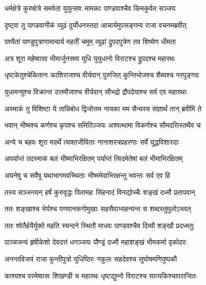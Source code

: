\twolineshloka
{धर्मक्षेत्रे कुरुक्षेत्रे समवेता युयुत्सवः}
{मामकाः पाण्डवाश्चैव किमकुर्वत सञ्जय}%

\twolineshloka
{दृष्ट्वा तु पाण्डवानीकं व्यूढं दुर्योधनस्तदा}
{आचार्यमुपसङ्गम्य राजा वचनमब्रवीत्}%

\twolineshloka
{पश्यैतां पाण्डुपुत्राणामाचार्य महतीं चमूम्}
{व्यूढां द्रुपदपुत्रेण तव शिष्येण धीमता}%

\twolineshloka
{अत्र शूरा महेष्वासा भीमार्जुनसमा युधि}
{युयुधानो विराटश्च द्रुपदश्च महारथः}%

\twolineshloka
{धृष्टकेतुश्चेकितानः काशिराजश्च वीर्यवान्}
{पुरुजित् कुन्तिभोजश्च शैब्यश्च नरपुङ्गवः}%

\twolineshloka
{युधामन्युश्च विक्रान्त उत्तमौजाश्च वीर्यवान्}
{सौभद्रो द्रौपदेयाश्च सर्व एव महारथाः}%

\twolineshloka
{अस्माकं तु विशिष्टा ये तान्निबोध द्विजोत्तम}
{नायका मम सैन्यस्य संज्ञार्थं तान् ब्रवीमि ते}%

\twolineshloka
{भवान् भीष्मश्च कर्णश्च कृपश्च समितिञ्जयः}
{अश्वत्थामा विकर्णश्च सौमदत्तिस्तथैव च}%

\twolineshloka
{अन्ये च बहवः शूरा मदर्थे त्यक्तजीविताः}
{नानाशस्त्रप्रहरणाः सर्वे युद्धविशारदाः}%

\twolineshloka
{अपर्याप्तं तदस्माकं बलं भीष्माभिरक्षितम्}
{पर्याप्तं त्विदमेतेषां बलं भीमाभिरक्षितम्}%

\twolineshloka
{अयनेषु च सर्वेषु यथाभागमवस्थिताः}
{भीष्ममेवाभिरक्षन्तु भवन्तः सर्व एव हि}%

\twolineshloka
{तस्य सञ्जनयन् हर्षं कुरुवृद्धः पितामहः}
{सिंहनादं विनद्योच्चैः शङ्खं दध्मौ प्रतापवान्}%

\twolineshloka
{ततः शङ्खाश्च भेर्यश्च पणवानकगोमुखाः}
{सहसैवाभ्यहन्यन्त स शब्दस्तुमुलोऽभवत्}%

\twolineshloka
{ततः श्वेतैर्हयैर्युक्ते महति स्यन्दने स्थितौ}
{माधवः पाण्डवश्चैव दिव्यौ शङ्खौ प्रदध्मतुः}%

\twolineshloka
{पाञ्चजन्यं हृषीकेशो देवदत्तं धनञ्जयः}
{पौण्ड्रं दध्मौ महाशङ्खं भीमकर्मा वृकोदरः}%

\twolineshloka
{अनन्तविजयं राजा कुन्तीपुत्रो युधिष्ठिरः}
{नकुलः सहदेवश्च सुघोषमणिपुष्पकौ}%

\twolineshloka
{काश्यश्च परमेष्वासः शिखण्डी च महारथः}
{धृष्टद्युम्नो विराटश्च सात्यकिश्चापराजितः}%

